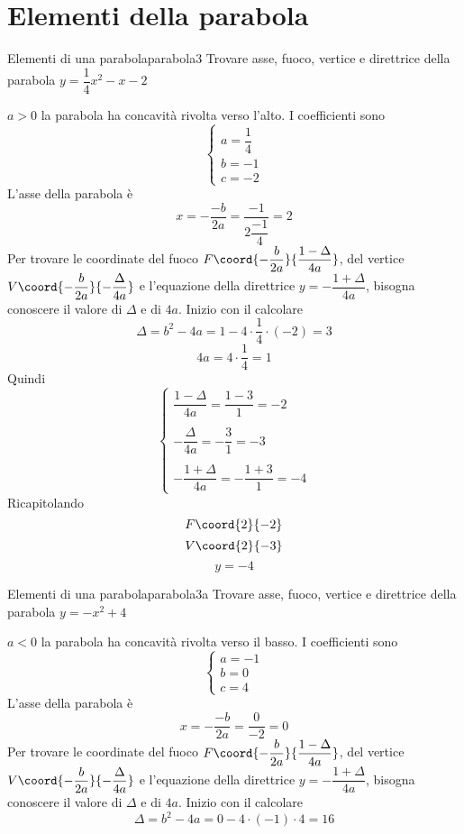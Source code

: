 \section{Elementi della parabola}	
\begin{esempiot}{Elementi di una parabola}{parabola3}
	Trovare asse, fuoco, vertice e direttrice della parabola $y=\dfrac{1}{4}x^2-x-2$
\end{esempiot}
$a>0$ la parabola ha concavità rivolta verso l'alto. I coefficienti sono\[\begin{cases}
a=\dfrac{1}{4}\\
b=-1\\
c=-2
\end{cases} \]
L'asse della parabola è\[x=-\dfrac{-b}{2a}=\dfrac{-1}{2\dfrac{-1}{4}}=2 \]
Per trovare le coordinate del fuoco $F\coord{-\dfrac{b}{2a}}{\dfrac{1-\Delta}{4a}}$, del vertice $V\coord{-\dfrac{b}{2a}}{-\dfrac{\Delta}{4a}}$ e l'equazione della direttrice $y=-\dfrac{1+\Delta}{4a}$, bisogna conoscere il valore di $\Delta$ e di $4a$. Inizio con il calcolare \[\Delta=b^2-4a=1-4\cdot\dfrac{1}{4}\cdot(-2)=3\]
\[4a=4\cdot\dfrac{1}{4}=1\]
Quindi \[\begin{cases}
\dfrac{1-\Delta}{4a}=\dfrac{1-3}{1}=-2\\
\\
-\dfrac{\Delta}{4a}=-\dfrac{3}{1}=-3\\
\\
-\dfrac{1+\Delta}{4a}=-\dfrac{1+3}{1}=-4
\end{cases} \]
Ricapitolando \[F\coord{2}{-2} \]\[V\coord{2}{-3} \]\[y=-4 \]
\begin{center}
	
	\label{fig:disegnoparabola3}
\end{center}
\begin{esempiot}{Elementi di una parabola}{parabola3a}
	Trovare asse, fuoco, vertice e direttrice della parabola $y=-x^2+4$
\end{esempiot}
$a<0$ la parabola ha concavità rivolta verso il basso. I coefficienti sono\[\begin{cases}
a=-1\\
b=0\\
c=4
\end{cases} \]
L'asse della parabola è\[x=-\dfrac{-b}{2a}=\dfrac{0}{-2}=0 \]
Per trovare le coordinate del fuoco $F\coord{-\dfrac{b}{2a}}{\dfrac{1-\Delta}{4a}}$, del vertice $V\coord{-\dfrac{b}{2a}}{-\dfrac{\Delta}{4a}}$ e l'equazione della direttrice $y=-\dfrac{1+\Delta}{4a}$, bisogna conoscere il valore di $\Delta$ e di $4a$. Inizio con il calcolare \[\Delta=b^2-4a=0-4\cdot(-1)\cdot4=16\]
